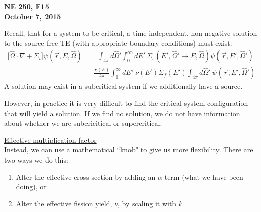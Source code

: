 \documentclass[12pt]{article}
\newcommand{\vOmega}{\ensuremath{\hat{\Omega}}}
\begin{document}
\begin{center}
{\bf NE 250, F15\\
October 7, 2015 
}
\end{center}

Recall, that for a system to be critical, a time-independent, non-negative solution to the source-free TE (with appropriate boundary conditions)  must exist:
\begin{align*}
\bigl[\vOmega \cdot \nabla + \Sigma_t\bigr] \psi(\vec{r}, E, \vOmega) &= \int_{4 \pi} d\vOmega' \int_0^{\infty} dE' \: \Sigma_s(E', \vOmega' \rightarrow E, \vOmega) \psi(\vec{r}, E', \vOmega')\\
 &+ \frac{\chi(E)}{4 \pi}\int_0^{\infty} dE' \: \nu(E') \Sigma_f(E') \int_{4 \pi} d\vOmega' \:\psi(\vec{r}, E', \vOmega')
\end{align*}
%
A solution may exist in a subcritical system if we additionally have a source.

However, in practice it is very difficult to find the critical system configuration that will yield a solution. If we find no solution, we do not have information about whether we are subcricitical or supercritical.

\underline{Effective multiplication factor}\\
Instead, we can use a mathematical ``knob" to give us more flexibility. There are two ways we do this:
\begin{enumerate}
\item Alter the effective cross section by adding an $\alpha$  term (what we have been doing), or
\item Alter the effective fission yield, $\nu$, by scaling it with $k$
\end{enumerate}
\end{document}
